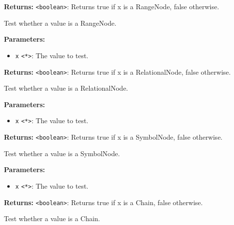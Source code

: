 \documentclass[12pt,a4paper]{article}
\begin{document}
\noindent \textbf{Returns:} \texttt{<boolean>}: Returns true if \textasciigrave{}x\textasciigrave{} is a RangeNode, false otherwise.

\noindent Test whether a value is a RangeNode.

\vspace{5mm}
\noindent {}


\noindent \textbf{Parameters:}
\begin{itemize}
  \item \texttt{x} \texttt{<*>}: The value to test.
\end{itemize}

\noindent \textbf{Returns:} \texttt{<boolean>}: Returns true if \textasciigrave{}x\textasciigrave{} is a RelationalNode, false otherwise.

\noindent Test whether a value is a RelationalNode.

\vspace{5mm}
\noindent {}


\noindent \textbf{Parameters:}
\begin{itemize}
  \item \texttt{x} \texttt{<*>}: The value to test.
\end{itemize}

\noindent \textbf{Returns:} \texttt{<boolean>}: Returns true if \textasciigrave{}x\textasciigrave{} is a SymbolNode, false otherwise.

\noindent Test whether a value is a SymbolNode.

\vspace{5mm}
\noindent {}


\noindent \textbf{Parameters:}
\begin{itemize}
  \item \texttt{x} \texttt{<*>}: The value to test.
\end{itemize}

\noindent \textbf{Returns:} \texttt{<boolean>}: Returns true if \textasciigrave{}x\textasciigrave{} is a Chain, false otherwise.

\noindent Test whether a value is a Chain.
\end{document}
